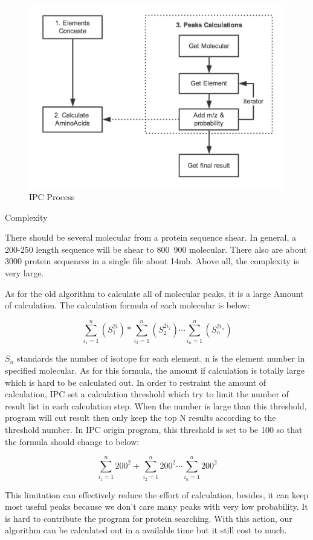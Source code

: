 \documentclass[letterpaper,twocolumn,10pt]{article}
\begin{document}
\begin{figure}[h!]
\centering
\includegraphics[scale=0.45]{ipc01}
\caption{IPC Process}
\label{threadsVsSync}
\end{figure}

Complexity

There should be several molecular from a protein sequence shear. In general, a 200-250 length sequence will be shear to 800~900 molecular. There also are about 3000 protein sequences in a single file about 14mb. Above all, the complexity is very large.

As for the old algorithm to calculate all of molecular peaks, it is a large Amount of calculation.  The calculation formula of each molecular is below:

$$\sum_{i_1=1}^n (S_1^{2i}) * \sum_{i_2=1}^n (S_2^{2{i_2}}) \cdots  \sum_{i_n=1}^n (S_n^{2{i_n}}) $$

$S_n$ standards the number of isotope for each element. n is the element number in specified molecular. As for this formula, the amount if calculation is totally large which is hard to be calculated out. In order to restraint the amount of calculation, IPC set a calculation threshold which try to limit the number of result list in each calculation step.  When the number is large than this threshold, program will cut result then only keep the top N results according to the threshold number. In IPC origin program, this threshold is set to be 100 so that the formula should change to below:

$$\sum_{i_1=1}^n 200^2 + \sum_{i_2=1}^n 200^2 \cdots \sum_{i_n=1}^n 200^2$$

This limitation can effectively reduce the effort of calculation, besides, it can keep most useful peaks because we don't care many peaks with very low probability. It is hard to contribute the program for protein searching.  With this action, our algorithm can be calculated out in a available time but it still cost to much. 
\end{document}
